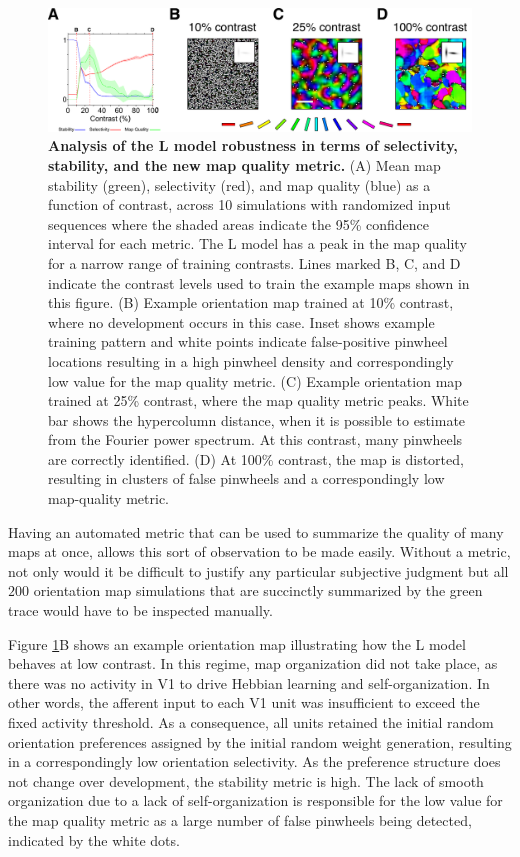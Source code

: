 \documentclass[phd,ianc,twoside]{infthesis}
\begin{document}
\begin{figure}
\centerline{
\includegraphics[width=1\textwidth]{./figures/L.pdf}
}
\caption[]{{\bf Analysis of the L model robustness in terms of
    selectivity, stability, and the new map quality metric.} (A) Mean map
  stability (green), selectivity (red), and map quality (blue) as a
  function of contrast, across 10 simulations with randomized input
  sequences where the shaded areas indicate the 95\% confidence interval
  for each metric. The L model has a peak in the map quality for a
  narrow range of training contrasts. Lines marked B, C, and D indicate
  the contrast levels used to train the example maps shown in this
  figure. (B) Example orientation map trained at 10\% contrast, where no
  development occurs in this case. Inset shows example training pattern and white
  points indicate false-positive pinwheel locations resulting in a high
  pinwheel density and correspondingly low value for the map quality
  metric. (C) Example orientation map trained at 25\% contrast, where the
  map quality metric peaks. White bar shows the hypercolumn distance, when it is possible to 
  estimate from the Fourier power spectrum. At this contrast, many
  pinwheels are correctly identified. (D) At 100\% contrast, the map is
  distorted, resulting in clusters of false pinwheels and a
  correspondingly low map-quality metric.}
\label{fig:L_model_metrics}
\end{figure}

Having an automated metric that can be used to summarize the quality of
many maps at once, allows this sort of observation to be made
easily. Without a metric, not only would it be difficult to justify any
particular subjective judgment but all $200$ orientation map simulations
that are succinctly summarized by the green trace would have to be
inspected manually.

Figure \ref{fig:L_model_metrics}B shows an example orientation map
illustrating how the L model behaves at low contrast. In this regime,
map organization did not take place, as there was no activity in V1 to
drive Hebbian learning and self-organization. In other words, the
afferent input to each V1 unit was insufficient to exceed the fixed
activity threshold. As a consequence, all units retained the initial
random orientation preferences assigned by the initial random weight
generation, resulting in a correspondingly low orientation
selectivity. As the preference structure does not change over
development, the stability metric is high. The lack of smooth
organization due to a lack of self-organization is responsible for the
low value for the map quality metric as a large number of false pinwheels
being detected, indicated by the white dots.
\end{document}
